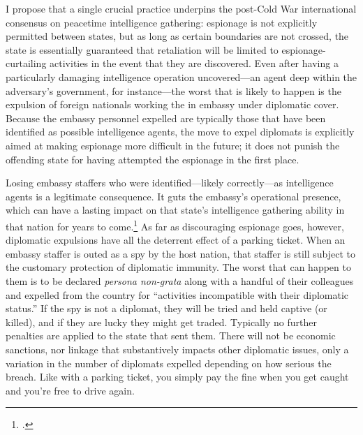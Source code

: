 \documentclass{memoir}
\begin{document}
\begin{refsegment}
I propose that a single crucial practice underpins the post-Cold War international consensus on peacetime intelligence gathering: espionage is not explicitly permitted between states, but as long as certain boundaries are not crossed, the state is essentially guaranteed that retaliation will be limited to espionage-curtailing activities in the event that they are discovered. Even after having a particularly damaging intelligence operation uncovered---an agent deep within the adversary's government, for instance---the worst that is likely to happen is the expulsion of foreign nationals working the in embassy under diplomatic cover. Because the embassy personnel expelled are typically those that have been identified as possible intelligence agents, the move to expel diplomats is explicitly aimed at making espionage more difficult in the future; it does not punish the offending state for having attempted the espionage in the first place.

Losing embassy staffers who were identified---likely correctly---as intelligence agents is a legitimate consequence. It guts the embassy's operational presence, which can have a lasting impact on that state's intelligence gathering ability in that nation for years to come.\footcite{macintyre_spy_2018} As far as discouraging espionage goes, however, diplomatic expulsions have all the deterrent effect of a parking ticket. When an embassy staffer is outed as a spy by the host nation, that staffer is still subject to the customary protection of diplomatic immunity. The worst that can happen to them is to be declared \emph{persona non-grata} along with a handful of their colleagues and expelled from the country for ``activities incompatible with their diplomatic status.'' If the spy is not a diplomat, they will be tried and held captive (or killed), and if they are lucky they might get traded. Typically no further penalties are applied to the state that sent them. There will not be economic sanctions, nor linkage that substantively impacts other diplomatic issues, only a variation in the number of diplomats expelled depending on how serious the breach. Like with a parking ticket, you simply pay the fine when you get caught and you're free to drive again.


\end{refsegment}
\end{document}
